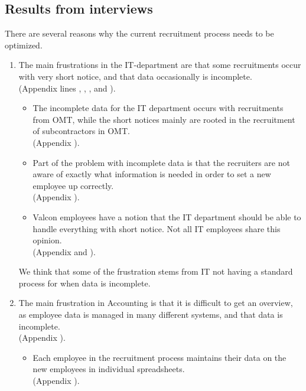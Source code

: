 \subsection{Results from interviews}
There are several reasons why the current recruitment process needs to be optimized.

\begin{enumerate}
\item The main frustrations in the IT-department are that some recruitments occur with very short notice, and that data occasionally is incomplete.\\
(Appendix  lines , , , and ).
\begin{itemize}
\item The incomplete data for the IT department occurs with recruitments from OMT, while the short notices mainly are rooted in the recruitment of subcontractors in OMT.\\
(Appendix ).
\item Part of the problem with incomplete data is that the recruiters are not aware of exactly what information is needed in order to set a new employee up correctly.\\
(Appendix ).
\item Valcon employees have a notion that the IT department should be able to handle everything with short notice. Not all IT employees share this opinion.\\
(Appendix  and ).
\end{itemize}

We think that some of the frustration stems from IT not having a standard process for when data is incomplete.

\item The main frustration in Accounting is that it is difficult to get an overview, as employee data is managed in many different systems, and that data is incomplete.\\
(Appendix ).
\begin{itemize}
\item Each employee in the recruitment process maintains their data on the new employees in individual spreadsheets.\\
(Appendix ).
\end{itemize}


\end{enumerate}
